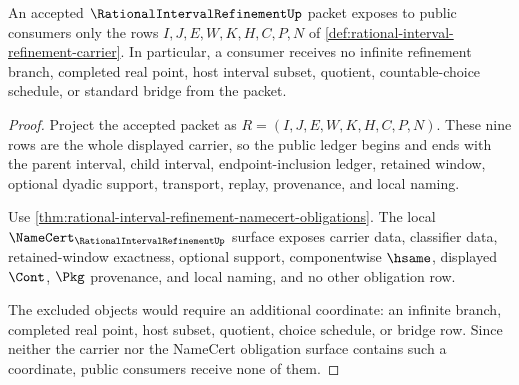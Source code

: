 \begin{theorem}
\label{thm:rational-interval-refinement-ledger-exhaustion}
An accepted $\RationalIntervalRefinementUp$ packet exposes to public consumers only the rows $I,J,E,W,K,H,C,P,N$ of \autoref{def:rational-interval-refinement-carrier}. In particular, a consumer receives no infinite refinement branch, completed real point, host interval subset, quotient, countable-choice schedule, or standard bridge from the packet.
\end{theorem}
\begin{proof}
Project the accepted packet as $R=(I,J,E,W,K,H,C,P,N)$. These nine rows are the whole displayed carrier, so the public ledger begins and ends with the parent interval, child interval, endpoint-inclusion ledger, retained window, optional dyadic support, transport, replay, provenance, and local naming.

Use \autoref{thm:rational-interval-refinement-namecert-obligations}. The local $\NameCert_{\RationalIntervalRefinementUp}$ surface exposes carrier data, classifier data, retained-window exactness, optional support, componentwise $\hsame$, displayed $\Cont$, $\Pkg$ provenance, and local naming, and no other obligation row.

The excluded objects would require an additional coordinate: an infinite branch, completed real point, host subset, quotient, choice schedule, or bridge row. Since neither the carrier nor the NameCert obligation surface contains such a coordinate, public consumers receive none of them.
\end{proof}

